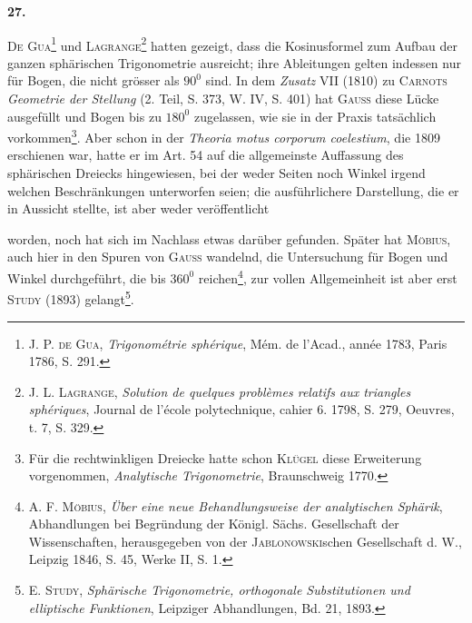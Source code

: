 \clearpage\begingroup{}
\renewcommand{\thefootnote}{\arabic{footnote})}\setcounter{footnote}{2}
\begin{center}
\textbf{27.}\par\smallskip
{}
\end{center}
\noindent\hspace*{\parindent}\textsc{De Gua}\footnote{J. P. \textsc{de Gua}, \textit{Trigonométrie sphérique}, Mém. de l’Acad., année 1783, Paris 1786, S. 291.} und \textsc{Lagrange}\footnote{J. L. \textsc{Lagrange}, \textit{Solution de quelques problèmes relatifs aux triangles sphériques}, Journal de l’école polytechnique, cahier 6. 1798, S. 279, Oeuvres, t. 7, S. 329.} hatten gezeigt, dass die Kosinusformel zum
Aufbau der ganzen sphärischen Trigonometrie ausreicht; ihre Ableitungen
gelten indessen nur für Bogen, die nicht grösser als \(90^0\) sind. In dem \textit{Zusatz}
VII (1810) zu \textsc{Carnots} \textit{Geometrie der Stellung} (2. Teil, S. 373, W. IV, S. 401)
hat \textsc{Gauss} diese Lücke ausgefüllt und Bogen bis zu \(180^0\) zugelassen, wie sie
in der Praxis tatsächlich vorkommen\footnote{Für die rechtwinkligen Dreiecke hatte schon \textsc{Klügel} diese Erweiterung vorgenommen, \textit{Analytische Trigonometrie}, Braunschweig 1770.}. Aber schon in der \textit{Theoria motus corporum coelestium}, die 1809 erschienen war, hatte er im Art. 54 auf die allgemeinste
Auffassung des sphärischen Dreiecks hingewiesen, bei der weder Seiten
noch Winkel irgend welchen Beschränkungen unterworfen seien; die ausführlichere
Darstellung, die er in Aussicht stellte, ist aber weder veröffentlicht
\par\smallskip{}\par
\clearpage{}\setcounter{footnote}{0}
\noindent worden, noch hat sich im Nachlass etwas darüber gefunden. Später hat
\textsc{Möbius}, auch hier in den Spuren von \textsc{Gauss} wandelnd, die Untersuchung für
Bogen und Winkel durchgeführt, die bis \(360^0\) reichen\footnote{A. F. \textsc{Möbius}, \textit{Über eine neue Behandlungsweise der analytischen Sphärik}, Abhandlungen bei Begründung der Königl. Sächs. Gesellschaft der Wissenschaften, herausgegeben von der \textsc{Jablonowski}schen Gesellschaft d. W., Leipzig 1846, S. 45, Werke II, S. 1.}, zur vollen Allgemeinheit
ist aber erst \textsc{Study} (1893) gelangt\footnote{E. \textsc{Study}, \textit{Sphärische Trigonometrie, orthogonale Substitutionen und elliptische Funktionen}, Leipziger Abhandlungen, Bd. 21, 1893.}.
